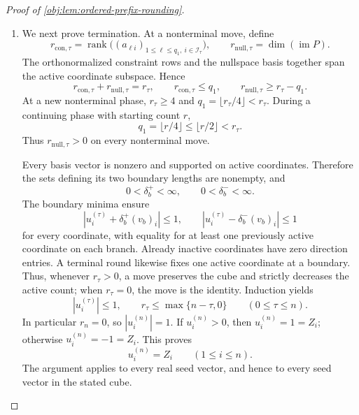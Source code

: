 \begin{proof}[Proof of \cref{obj:lem:ordered-prefix-rounding}]
\begin{enumerate}
Thus induction over the finite move recursion gives joint Borel measurability of \(u^{(n)}\). In particular,
\[
\{(a,\boldsymbol\eta):Z_i(a,\boldsymbol\eta)=1\}
=
\{(a,\boldsymbol\eta):u_i^{(n)}(a,\boldsymbol\eta)>0\}
\]
is Borel for every coordinate. Since the sign space is finite, the output map is jointly Borel. When \(n=0\), it is the constant map into the singleton empty sign space.

\item
We next prove termination. At a nonterminal move, define
\[
r_{\mathrm{con},\tau}
=\operatorname{rank}\bigl((a_{\ell i})_{1\leq\ell\leq q_1,\ i\in\mathcal I_\tau}\bigr),
\qquad
r_{\mathrm{null},\tau}=\dim(\operatorname{im}P).
\]
The orthonormalized constraint rows and the nullspace basis together span the active coordinate subspace. Hence
\[
r_{\mathrm{con},\tau}+r_{\mathrm{null},\tau}=r_\tau,
\qquad
r_{\mathrm{con},\tau}\leq q_1,
\qquad
r_{\mathrm{null},\tau}\geq r_\tau-q_1.
\]
At a new nonterminal phase, \(r_\tau\geq4\) and
\(q_1=\lfloor r_\tau/4\rfloor<r_\tau\). During a continuing phase with starting count \(r\),
\[
q_1=\lfloor r/4\rfloor
\leq\lfloor r/2\rfloor<r_\tau.
\]
Thus \(r_{\mathrm{null},\tau}>0\) on every nonterminal move.

Every basis vector is nonzero and supported on active coordinates. Therefore the sets defining its two boundary lengths are nonempty, and
\[
0<\delta_b^+<\infty,\qquad
0<\delta_b^-<\infty.
\]
The boundary minima ensure
\[
|u_i^{(\tau)}+\delta_b^+(v_b)_i|\leq1,
\qquad
|u_i^{(\tau)}-\delta_b^-(v_b)_i|\leq1
\]
for every coordinate, with equality for at least one previously active coordinate on each branch. Already inactive coordinates have zero direction entries. A terminal round likewise fixes one active coordinate at a boundary. Thus, whenever \(r_\tau>0\), a move preserves the cube and strictly decreases the active count; when \(r_\tau=0\), the move is the identity. Induction yields
\[
|u_i^{(\tau)}|\leq1,
\qquad
r_\tau\leq\max\{n-\tau,0\}
\qquad(0\leq\tau\leq n).
\]
In particular \(r_n=0\), so \(|u_i^{(n)}|=1\). If \(u_i^{(n)}>0\), then \(u_i^{(n)}=1=Z_i\); otherwise \(u_i^{(n)}=-1=Z_i\). This proves
\[
u_i^{(n)}=Z_i
\qquad(1\leq i\leq n).
\]
The argument applies to every real seed vector, and hence to every seed vector in the stated cube.


\end{enumerate}
\end{proof}
